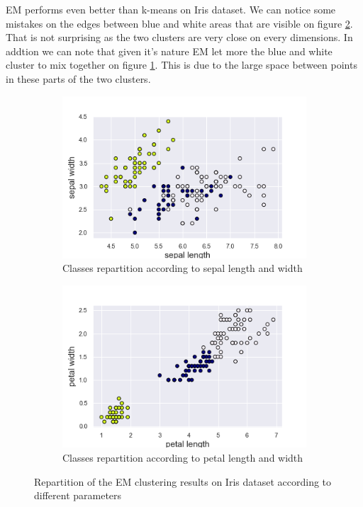 \documentclass[twocolumn, 10pt]{article}
\begin{document}
			EM performs even better than k-means on Iris dataset. We can notice some mistakes on the edges between blue and white areas that are visible on figure \ref{fig:iris_EM_pet}. That is not surprising as the two clusters are very close on every dimensions. In addtion we can note that given it's nature EM let more the blue and white cluster to mix together on figure \ref{fig:iris_EM_sep}. This is due to the large space between points in these parts of the two clusters.

			\begin{figure}[h]
				\centering
				\begin{subfigure}[t]{.49\columnwidth}
					\centering
					\includegraphics[width=\linewidth]{../graphics/EM_sepal_length_sepal_width_label.png}
					\caption{Classes repartition according to sepal length and width}
					\label{fig:iris_EM_sep}
				\end{subfigure}
				\begin{subfigure}[t]{.49\columnwidth}
					\centering
					\includegraphics[width=\linewidth]{../graphics/EM_petal_length_petal_width_label.png}
					\caption{Classes repartition according to petal length and width}
					\label{fig:iris_EM_pet}
				\end{subfigure}
				\caption{Repartition of the EM clustering results on Iris dataset according to different parameters}
				\label{fig:iris_EM}
			\end{figure}
\end{document}
